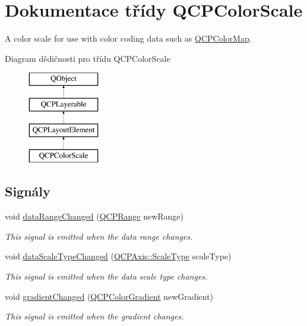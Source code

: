 \hypertarget{classQCPColorScale}{}\section{Dokumentace třídy Q\+C\+P\+Color\+Scale}
\label{classQCPColorScale}


A color scale for use with color coding data such as \hyperlink{classQCPColorMap}{Q\+C\+P\+Color\+Map}.  


Diagram dědičnosti pro třídu Q\+C\+P\+Color\+Scale\begin{figure}[H]
\begin{center}
\leavevmode
\includegraphics[height=4.000000cm]{classQCPColorScale}
\end{center}
\end{figure}
\subsection*{Signály}
\begin{DoxyCompactItemize}
\item 
void \hyperlink{classQCPColorScale_a293176da9447ec6819be1d901966a257}{data\+Range\+Changed} (\hyperlink{classQCPRange}{Q\+C\+P\+Range} new\+Range)
\begin{DoxyCompactList}\small\item\em This signal is emitted when the data range changes. \end{DoxyCompactList}\item 
void \hyperlink{classQCPColorScale_a61558b962f7791ff2f15a565dcf60181}{data\+Scale\+Type\+Changed} (\hyperlink{classQCPAxis_a36d8e8658dbaa179bf2aeb973db2d6f0}{Q\+C\+P\+Axis\+::\+Scale\+Type} scale\+Type)
\begin{DoxyCompactList}\small\item\em This signal is emitted when the data scale type changes. \end{DoxyCompactList}\item 
void \hyperlink{classQCPColorScale_a67a5eb06cf551d322885e8635a46378c}{gradient\+Changed} (\hyperlink{classQCPColorGradient}{Q\+C\+P\+Color\+Gradient} new\+Gradient)
\begin{DoxyCompactList}\small\item\em This signal is emitted when the gradient changes. \end{DoxyCompactList}\end{DoxyCompactItemize}
